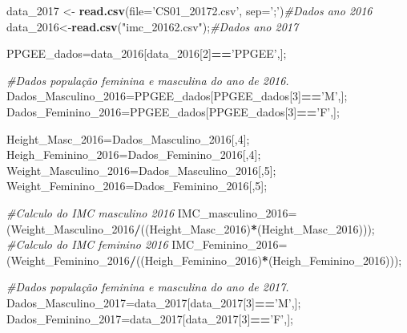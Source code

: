 \documentclass[]{article}
\newenvironment{Shaded}{\begin{snugshade}}{\end{snugshade}}
\newcommand{\CommentTok}[1]{\textcolor[rgb]{0.56,0.35,0.01}{\textit{#1}}}
\newcommand{\DataTypeTok}[1]{\textcolor[rgb]{0.13,0.29,0.53}{#1}}
\newcommand{\DecValTok}[1]{\textcolor[rgb]{0.00,0.00,0.81}{#1}}
\newcommand{\KeywordTok}[1]{\textcolor[rgb]{0.13,0.29,0.53}{\textbf{#1}}}
\newcommand{\NormalTok}[1]{#1}
\newcommand{\OperatorTok}[1]{\textcolor[rgb]{0.81,0.36,0.00}{\textbf{#1}}}
\newcommand{\StringTok}[1]{\textcolor[rgb]{0.31,0.60,0.02}{#1}}
\begin{document}
\begin{Shaded}
\begin{Highlighting}[]
\NormalTok{data_}\DecValTok{2017}\NormalTok{ <-}\StringTok{ }\KeywordTok{read.csv}\NormalTok{(}\DataTypeTok{file=}\StringTok{'CS01_20172.csv'}\NormalTok{, }\DataTypeTok{sep=}\StringTok{';'}\NormalTok{)}\CommentTok{#Dados ano 2016}
\NormalTok{data_}\DecValTok{2016}\NormalTok{<-}\KeywordTok{read.csv}\NormalTok{(}\StringTok{"imc_20162.csv"}\NormalTok{);}\CommentTok{#Dados ano 2017}

\NormalTok{PPGEE_dados=data_}\DecValTok{2016}\NormalTok{[data_}\DecValTok{2016}\NormalTok{[}\DecValTok{2}\NormalTok{]}\OperatorTok{==}\StringTok{'PPGEE'}\NormalTok{,];}

\CommentTok{#Dados população feminina e masculina do ano de 2016.}
\NormalTok{Dados_Masculino_}\DecValTok{2016}\NormalTok{=PPGEE_dados[PPGEE_dados[}\DecValTok{3}\NormalTok{]}\OperatorTok{==}\StringTok{'M'}\NormalTok{,];}
\NormalTok{Dados_Feminino_}\DecValTok{2016}\NormalTok{=PPGEE_dados[PPGEE_dados[}\DecValTok{3}\NormalTok{]}\OperatorTok{==}\StringTok{'F'}\NormalTok{,];}

\NormalTok{Height_Masc_}\DecValTok{2016}\NormalTok{=Dados_Masculino_}\DecValTok{2016}\NormalTok{[,}\DecValTok{4}\NormalTok{];}
\NormalTok{Heigh_Feminino_}\DecValTok{2016}\NormalTok{=Dados_Feminino_}\DecValTok{2016}\NormalTok{[,}\DecValTok{4}\NormalTok{];}
\NormalTok{Weight_Masculino_}\DecValTok{2016}\NormalTok{=Dados_Masculino_}\DecValTok{2016}\NormalTok{[,}\DecValTok{5}\NormalTok{];}
\NormalTok{Weight_Feminino_}\DecValTok{2016}\NormalTok{=Dados_Feminino_}\DecValTok{2016}\NormalTok{[,}\DecValTok{5}\NormalTok{];}

\CommentTok{#Calculo do IMC masculino 2016}
\NormalTok{IMC_masculino_}\DecValTok{2016}\NormalTok{=(Weight_Masculino_}\DecValTok{2016}\OperatorTok{/}\NormalTok{((Height_Masc_}\DecValTok{2016}\NormalTok{)}\OperatorTok{*}\NormalTok{(Height_Masc_}\DecValTok{2016}\NormalTok{)));}
\CommentTok{#Calculo do IMC feminino 2016}
\NormalTok{IMC_Feminino_}\DecValTok{2016}\NormalTok{=(Weight_Feminino_}\DecValTok{2016}\OperatorTok{/}\NormalTok{((Heigh_Feminino_}\DecValTok{2016}\NormalTok{)}\OperatorTok{*}\NormalTok{(Heigh_Feminino_}\DecValTok{2016}\NormalTok{)));}


\CommentTok{#Dados população feminina e masculina do ano de 2017.}
\NormalTok{Dados_Masculino_}\DecValTok{2017}\NormalTok{=data_}\DecValTok{2017}\NormalTok{[data_}\DecValTok{2017}\NormalTok{[}\DecValTok{3}\NormalTok{]}\OperatorTok{==}\StringTok{'M'}\NormalTok{,];}
\NormalTok{Dados_Feminino_}\DecValTok{2017}\NormalTok{=data_}\DecValTok{2017}\NormalTok{[data_}\DecValTok{2017}\NormalTok{[}\DecValTok{3}\NormalTok{]}\OperatorTok{==}\StringTok{'F'}\NormalTok{,];}


\end{Highlighting}
\end{Shaded}
\end{document}
